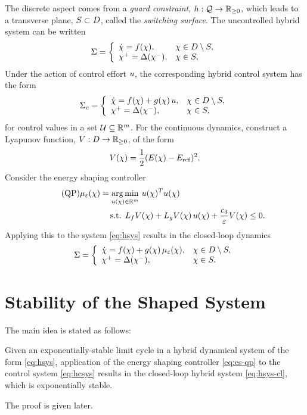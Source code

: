 \documentclass[twocolumn]{article}
\begin{document}
The discrete aspect comes from a {\em guard constraint}, $h : \mathcal{Q} \to \mathbb{R}_{\geq 0}$, which leads to a transverse plane, $S \subset D$, called the {\em switching surface}.
%
The uncontrolled hybrid system can be written
\begin{align}
  \Sigma = \left\{
  \begin{array}{l l}
    {\dot {\chi}} = f(\chi), & \chi \in D \setminus S,\\
    \chi^{+} = \Delta(\chi^{-}), & \chi \in S,
  \end{array}\right.
  \label{eq:hsys}
\end{align}
Under the action of control effort $u$, the corresponding hybrid control system has the form
\begin{align}
  \Sigma_{c} = \left\{
  \begin{array}{l l}
    {\dot {\chi}} = f(\chi) + g(\chi) \, u, & \chi \in D \setminus S,\\
    \chi^{+} = \Delta(\chi^{-}), & \chi \in S,
  \end{array}\right.
  \label{eq:hcsys}
\end{align}
for control values in a set $\mathcal{U} \subseteq \mathbb{R}^{m}$.
%
For the continuous dynamics, construct a Lyapunov function, $V : D \to \mathbb{R}_{\geq 0}$, of the form
\begin{align}
  \label{eq:lyap}
  V(\chi) = \frac{1}{2} (E(\chi) - E_{\mathrm{ref}})^2.
\end{align}
Consider the energy shaping controller
\begin{align}
  \label{eq:es-qp} \tag {QP}
  \mu_{\varepsilon}(\chi) = \operatorname*{arg\,min}_{u(\chi) \in \mathbb{R}^{m}} \ & u(\chi)^T u(\chi)\\
  \nonumber
  \mbox{s.t. } L_{f} V&(\chi) + L_{g} V(\chi) \, u(\chi) + \frac{c_{3}}{\varepsilon} V(\chi) \leq 0.
\end{align}
Applying this to the system \eqref{eq:hsys} results in the closed-loop dynamics
\begin{align}
  \label{eq:hsys-cl}
  \Sigma = \left\{
  \begin{array}{l l}
    {\dot {\chi}} = f(\chi) + g(\chi) \, \mu_{\varepsilon}(\chi), & \chi \in D \setminus S,\\
    \chi^{+} = \Delta(\chi^{-}), &\chi \in S.
  \end{array}\right.
\end{align}

\section{Stability of the Shaped System}

The main idea is stated as follows:
%
\begin{theorem}
  \label{theorem:main-theorem}
  Given an exponentially-stable limit cycle in a hybrid dynamical system of the form \eqref{eq:hsys}, application of the energy shaping controller \eqref{eq:es-qp} to the control system \eqref{eq:hcsys} results in the closed-loop hybrid system \eqref{eq:hsys-cl}, which is exponentially stable.
\end{theorem}
%
The proof is given later.
\end{document}

